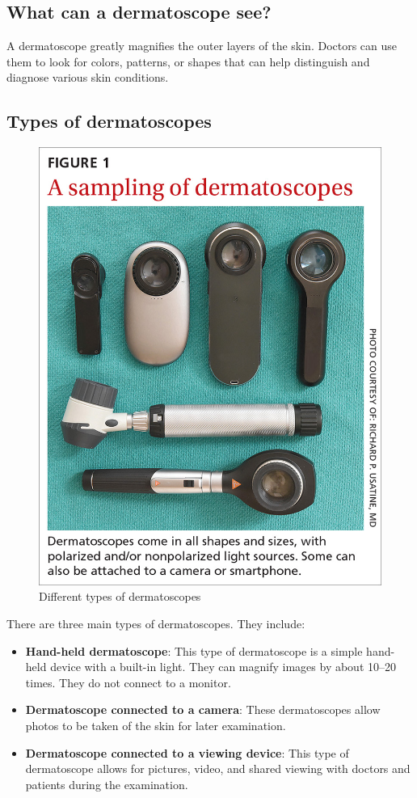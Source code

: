 \documentclass{article}
\begin{document}
\subsection{What can a dermatoscope see?}
A dermatoscope greatly magnifies the outer layers of the skin. Doctors can use them to look for colors, patterns, or shapes that can help distinguish and diagnose various skin conditions.
\subsection{Types of dermatoscopes}
\begin{figure} [h]
    \centering
    \includegraphics[scale=0.3]{Dermatoscopes.jpg}
    \caption{Different types of dermatoscopes}
    \label{fig_types of dermatoscopes}
\end{figure}
There are three main types of dermatoscopes. They include:
\begin{itemize}
\item \textbf{Hand-held dermatoscope}: This type of dermatoscope is a simple hand-held device with a built-in light. They can magnify images by about 10–20 times. They do not connect to a monitor.
\item \textbf{Dermatoscope connected to a camera}: These dermatoscopes allow photos to be taken of the skin for later examination.
\item \textbf{Dermatoscope connected to a viewing device}: This type of dermatoscope allows for pictures, video, and shared viewing with doctors and patients during the examination.
\end{itemize}
\end{document}
